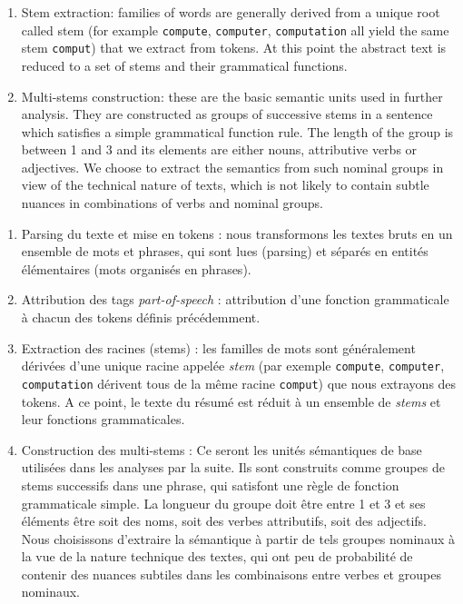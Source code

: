 {\begin{enumerate}
\item Stem extraction: families of words are generally derived from a unique root called stem (for example \texttt{compute}, \texttt{computer}, \texttt{computation} all yield the same stem \texttt{comput}) that we extract from tokens. At this point the abstract text is reduced to a set of stems and their grammatical functions.
\item Multi-stems construction: these are the basic semantic units used in further analysis. They are constructed as groups of successive stems in a sentence which satisfies a simple grammatical function rule. The length of the group is between 1 and 3 and its elements are either nouns, attributive verbs or adjectives. We choose to extract the semantics from such nominal groups in view of the technical nature of texts, which is not likely to contain subtle nuances in combinations of verbs and nominal groups.
\end{enumerate}
}{
\begin{enumerate}
	\item Parsing du texte et mise en tokens : nous transformons les textes bruts en un ensemble de mots et phrases, qui sont lues (parsing) et séparés en entités élémentaires (mots organisés en phrases).
	\item Attribution des tags \emph{part-of-speech} : attribution d'une fonction grammaticale à chacun des tokens définis précédemment.
	\item Extraction des racines (stems) : les familles de mots sont généralement dérivées d'une unique racine appelée \emph{stem} (par exemple \texttt{compute}, \texttt{computer}, \texttt{computation} dérivent tous de la même racine \texttt{comput}) que nous extrayons des tokens. A ce point, le texte du résumé est réduit à un ensemble de \emph{stems} et leur fonctions grammaticales.
	\item Construction des multi-stems : Ce seront les unités sémantiques de base utilisées dans les analyses par la suite. Ils sont construits comme groupes de stems successifs dans une phrase, qui satisfont une règle de fonction grammaticale simple. La longueur du groupe doit être entre 1 et 3 et ses éléments être soit des noms, soit des verbes attributifs, soit des adjectifs. Nous choisissons d'extraire la sémantique à partir de tels groupes nominaux à la vue de la nature technique des textes, qui ont peu de probabilité de contenir des nuances subtiles dans les combinaisons entre verbes et groupes nominaux. 
\end{enumerate}
}

